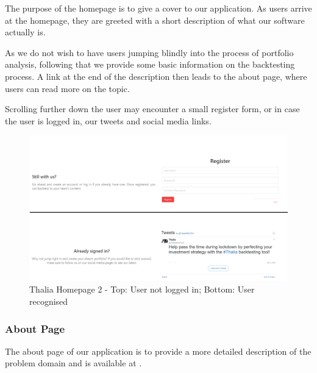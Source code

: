 \documentclass[main.tex]{subfiles}
\begin{document}
The purpose of the homepage is to give a cover to our application. As users arrive at the homepage, they are greeted with a short description of what our software actually is.

As we do not wish to have users jumping blindly into the process of portfolio analysis, following that we provide some basic information on the backtesting process. A link at the end of the description then leads to the about page, where users can read more on the topic.



Scrolling further down the user may encounter a small register form, or in case the user is logged in, our tweets and social media links.



\begin{figure}[H]

   \centering

   \includegraphics[width=\textwidth]{08Appendices/081User/081Pictures/homepage_bottom.png}

   \caption{Thalia Homepage 2 - Top: User not logged in; Bottom: User recognised}

   \label{thalia_home_bottom}

\end{figure}



\subsubsection{About Page}



The about page of our application is to provide a more detailed description of the problem domain and is available at .
\end{document}
